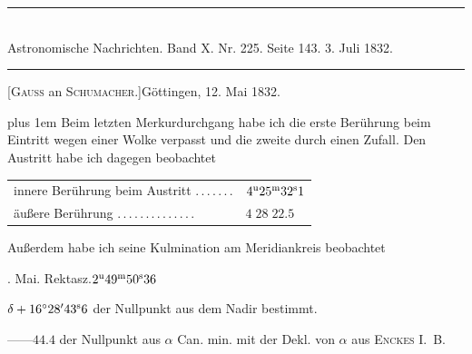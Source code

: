 \clearpage
{}
\begin{center}
\rule{0.55\linewidth}{0.4pt}\\[2pt]
Astronomische Nachrichten. Band X. Nr. 225. Seite 143. 3. Juli 1832.\\[2pt]
\rule{0.55\linewidth}{0.4pt}
\end{center}

\begin{center}[\textsc{Gauss} an \textsc{Schumacher.}]\quad Göttingen, 12. Mai 1832.\end{center}

{\rightskip=0pt plus 1em Beim letzten Merkurdurchgang habe ich die erste Berührung beim Eintritt wegen einer Wolke verpasst und die zweite durch einen Zufall. Den Austritt habe ich dagegen beobachtet\par}

\begin{center}
\begin{tabular}{ll}
innere Berührung beim Austritt \mbox{.\,.\,.\,.\,.\,.\,.} & $4^{\rm u}25^{\rm m}32^{\rm s}1$ \\
äußere Berührung \mbox{.\,.\,.\,.\,.\,.\,.\,.\,.\,.\,.\,.\,.\,.} & $4\;28\;22.5$ \\
\end{tabular}
\end{center}

Außerdem habe ich seine Kulmination am Meridiankreis beobachtet

\medskip
{}. Mai. Rektasz.\quad $2^{\rm u}49^{\rm m}50^{\rm s}36$\par
\noindent $\delta+16^\circ28'43^{\rm s}6$ der Nullpunkt aus dem Nadir bestimmt.\par
\noindent\hspace*{1em}---\quad ---\quad $44.4$ der Nullpunkt aus $\alpha$ Can. min. mit der Dekl. von $\alpha$ aus \textsc{Enckes} \mbox{I. B.}

